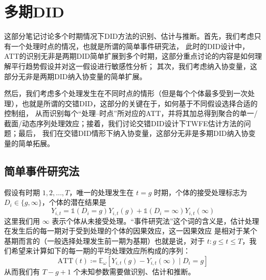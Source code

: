 \documentclass[../didNotes.tex]{subfiles}
\begin{document}
\section{多期DID}

这部分笔记讨论多个时期情况下DID方法的识别、估计与推断。首先，我们考虑只有一个处理时点的情况，也就是所谓的简单事件研究法，
此时的DID设计中，ATT的识别无非是两期DID简单扩展到多个时期，这部分重点讨论的内容是如何理解平行趋势假设并对这一假设进行敏感性分析；
其次，我们考虑纳入协变量，这部分无非是两期DID纳入协变量的简单扩展。

然后，我们考虑多个处理发生在不同时点的情形（但是每个个体最多受到一次处理），也就是所谓的交错DID，这部分的关键在于，如何基于不同假设选择合适的控制组，
从而识别每个``处理--时点''所对应的ATT，并将其加总得到聚合的单一/截面/动态序列处理效应；接着，我们讨论交错DID设计下TWFE估计方法的问题；最后，
我们在交错DID情形下纳入协变量，这部分无非是多期DID纳入协变量的简单拓展。

\subsection{简单事件研究法}

假设有时期 $1,2, \ldots ,T$，唯一的处理发生在 $t=g$ 时期，个体的接受处理标志为 $D_{i} \in \{ g,\infty \}$，个体的潜在结果是
$$
Y_{i,t} = \mathbb{1} (D_{i}=g) Y_{i,t}(g) + \mathbb{1} (D_{i}=\infty)Y_{i,t}(\infty)
$$
这里我们用 $\infty$ 表示个体从未接受处理。``事件研究法''这个词的含义是，估计处理在发生后的每一期对于受到处理的个体的因果效应，这一因果效应
是相对于某个基期而言的（一般选择处理发生前一期为基期）也就是说，对于 $t: g \le t \le T$，我们希望来计算如下的每一期的平均处理效应所构成的序列：
$$
\text{ATT}(t) \coloneqq \mathbb{E}_{\omega}[Y_{i,t}(g) - Y_{i,t}(\infty) \mid D_{i}=g]
$$
从而我们有 $T-g+1$ 个未知参数需要做识别、估计和推断。
\end{document}

